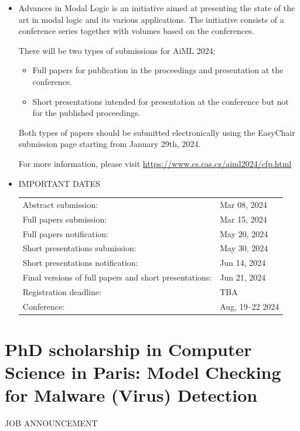 \documentclass[prodmode,acmtecs]{acmsmall} %
\begin{document}
\begin{itemize}\item  Advances in Modal Logic is an initiative aimed at presenting the state of the art in modal logic and its various applications. The initiative consists of a conference series together with volumes based on the conferences. 
 
  There will be two types of submissions for AiML 2024: 
 
\begin{itemize}\item  Full papers for publication in the proceedings and presentation at the conference.
\item  Short presentations intended for presentation at the conference but not for the published proceedings.
\end{itemize} 
  Both types of papers should be submitted electronically using the EasyChair submission page starting from January 29th, 2024. 
 
  For more information, please visit \href{https://www.cs.cas.cz/aiml2024/cfp.html}{https://www.cs.cas.cz/aiml2024/cfp.html} 
 
\item  IMPORTANT DATES 
 
\begin{tabulary}{\linewidth}{LL}Abstract submission:  & Mar 08, 2024 \\
Full papers submission:  & Mar 15, 2024 \\
Full papers notification:  & May 20, 2024 \\
Short presentations submission:  & May 30, 2024 \\
Short presentations notification:  & Jun 14, 2024 \\
Final versions of full papers and short presentations:  & Jun 21, 2024 \\
Registration deadline:  & TBA \\
Conference:  & Aug, 19–22 2024 \\
\end{tabulary}
 
\end{itemize}\section{PhD scholarship in Computer Science in Paris: Model Checking for Malware (Virus) Detection}\label{PhDscholarshipinComputerScienceinParis}JOB ANNOUNCEMENT 
\end{document}
